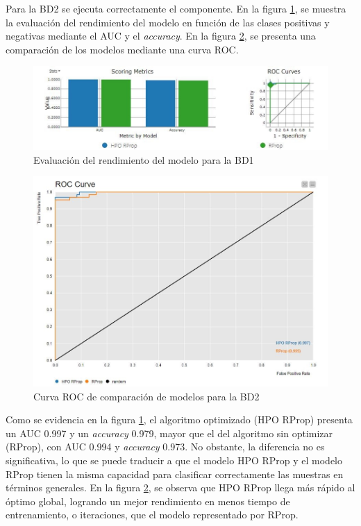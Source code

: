 Para la BD2 se ejecuta correctamente el componente. En la figura \ref{fig:eval-rend-modelo-bd2-hpo}, se muestra la evaluación del rendimiento del modelo en función de las clases positivas y negativas mediante el AUC y el \textit{accuracy}. En la figura \ref{fig:roc-bd2-hpo}, se presenta una comparación de los modelos mediante una curva ROC.

\begin{figure}[H]
	\centering
	\includegraphics[width=0.7\linewidth]{"figuras/capi 3/pruebas-ray/eval-rend-modelo-bd2-hpo"}
	\caption{Evaluación del rendimiento del modelo para la BD1}
	\label{fig:eval-rend-modelo-bd2-hpo}
\end{figure}

\begin{figure}[H]
	\centering
	\includegraphics[width=0.55\linewidth]{"figuras/capi 3/pruebas-ray/roc-bd2-hpo"}
	\caption{Curva ROC de comparación de modelos para la BD2}
	\label{fig:roc-bd2-hpo}
\end{figure}

Como se evidencia en la figura \ref{fig:eval-rend-modelo-bd2-hpo}, el algoritmo optimizado (HPO RProp) presenta un AUC 0.997 y un \textit{accuracy} 0.979, mayor que el del algoritmo sin optimizar (RProp), con AUC 0.994 y \textit{accuracy} 0.973. No obstante, la diferencia no es significativa, lo que se puede traducir a que el modelo HPO RProp y el modelo RProp tienen la misma capacidad para clasificar correctamente las muestras en términos generales. En la figura \ref{fig:roc-bd2-hpo}, se observa que HPO RProp llega más rápido al óptimo global, logrando un mejor rendimiento en menos tiempo de entrenamiento, o iteraciones, que el modelo representado por RProp.

